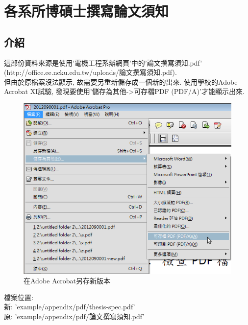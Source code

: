 \newpage
{}

\chapter{各系所博碩士撰寫論文須知}
\label{appendix:thesis-spec}

\section{介紹}
這部份資料來源是使用'電機工程系辦網頁'中的'論文撰寫須知.pdf' (http://office.ee.ncku.edu.tw/uploads/論文撰寫須知.pdf).\\

但由於原檔案沒法顯示, 故需要另重新儲存成一個新的出來. 使用學校的Adobe Acrobat XI試驗, 發現要使用'儲存為其他->可存檔PDF (PDF/A)'才能顯示出來.\\

\begin{figure}[h]
\centering
\includegraphics[scale=0.35]{./example/appendix/pic/save_pdf.png}
\caption{在Adobe Acrobat另存新版本}
\label{fig:appendix:save_pdf}
\end{figure}

檔案位置:\\
新: 'example/appendix/pdf/thesis-spec.pdf'\\
原: 'example/appendix/pdf/論文撰寫須知.pdf'\\



